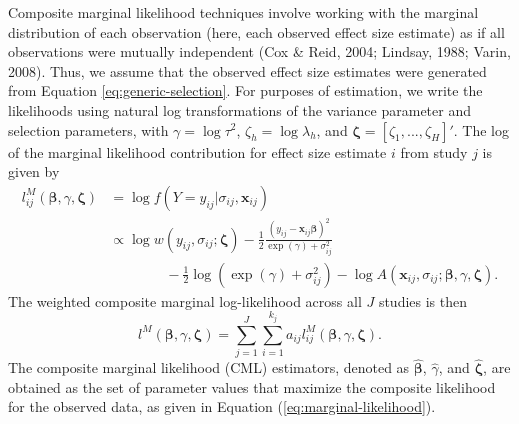 \documentclass[
  man, donotrepeattitle,floatsintext]{apa7}
\begin{document}
Composite marginal likelihood techniques involve working with the marginal distribution of each observation (here, each observed effect size estimate) as if all observations were mutually independent (Cox \& Reid, 2004; Lindsay, 1988; Varin, 2008).
Thus, we assume that the observed effect size estimates were generated from Equation \eqref{eq:generic-selection}.
For purposes of estimation, we write the likelihoods using natural log transformations of the variance parameter and selection parameters, with \(\gamma = \log \tau^2\), \(\zeta_h = \log \lambda_h\), and \(\boldsymbol\zeta = \left[\zeta_1,...,\zeta_H\right]'\).
The log of the marginal likelihood contribution for effect size estimate \(i\) from study \(j\) is given by
\begin{align}
l^M_{ij}\left(\boldsymbol\beta, \gamma, \boldsymbol\zeta \right) &= \log f\left(Y = y_{ij} | \sigma_{ij}, \mathbf{x}_{ij}\right) \nonumber \\
&\propto \log w\left(y_{ij}, \sigma_{ij}; \boldsymbol\zeta \right) - \frac{1}{2} \frac{\left(y_{ij} - \mathbf{x}_{ij} \boldsymbol\beta\right)^2}{\exp(\gamma) + \sigma_{ij}^2} \nonumber\\
& \qquad \qquad  - \frac{1}{2}\log\left(\exp(\gamma) + \sigma_{ij}^2\right) - \log A\left(\mathbf{x}_{ij}, \sigma_{ij}; \boldsymbol\beta, \gamma, \boldsymbol\zeta \right). \label{eq:log-like-ij}
\end{align}
The weighted composite marginal log-likelihood across all \(J\) studies is then
\begin{equation}
\label{eq:marginal-likelihood}
l^M\left(\boldsymbol\beta, \gamma, \boldsymbol\zeta\right) = \sum_{j=1}^J \sum_{i=1}^{k_j} a_{ij} l^M_{ij}\left(\boldsymbol\beta, \gamma, \boldsymbol\zeta\right).
\end{equation}
The composite marginal likelihood (CML) estimators, denoted as \(\boldsymbol{\hat\beta}\), \(\hat\gamma\), and \(\boldsymbol{\hat\zeta}\), are obtained as the set of parameter values that maximize the composite likelihood for the observed data, as given in Equation (\ref{eq:marginal-likelihood}).
\end{document}
